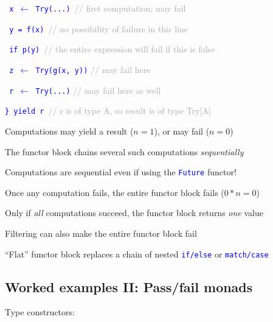\texttt{\textcolor{blue}{\footnotesize{}  x $\leftarrow$ Try(...)
}}\textcolor{darkgray}{\footnotesize{}// first computation; may fail}{\footnotesize\par}

\texttt{\textcolor{blue}{\footnotesize{}  y = f(x) }}\textcolor{darkgray}{\footnotesize{}//
no possibility of failure in this line}{\footnotesize\par}

\texttt{\textcolor{blue}{\footnotesize{}  if p(y) }}\textcolor{darkgray}{\footnotesize{}//
the entire expression will fail if this is false}{\footnotesize\par}

\texttt{\textcolor{blue}{\footnotesize{}  z $\leftarrow$ Try(g(x,
y))}}\textcolor{darkgray}{\footnotesize{} // may fail here}{\footnotesize\par}

\texttt{\textcolor{blue}{\footnotesize{}  r $\leftarrow$ Try(...)}}\textcolor{darkgray}{\footnotesize{}
// may fail here as well}{\footnotesize\par}

\texttt{\textcolor{blue}{\footnotesize{}\} yield r }}\textcolor{darkgray}{\footnotesize{}//
 r is of type A, so result is of type Try{[}A{]}}{\footnotesize\par}

Computations may yield a result ($n=1$), or may fail ($n=0$)

The functor block chains several such computations \emph{sequentially}

Computations are sequential even if using the \texttt{\textcolor{blue}{\footnotesize{}Future}}
functor!

Once any computation fails, the entire functor block fails ($0*n=0$)

Only if \emph{all} computations succeed, the functor block returns
\emph{one} value

Filtering can also make the entire functor block fail

``Flat'' functor block replaces a chain of nested \texttt{\textcolor{blue}{\footnotesize{}if/else}}
or \texttt{\textcolor{blue}{\footnotesize{}match/case}} 


\subsection{Worked examples II: Pass/fail monads}

Type constructors:

